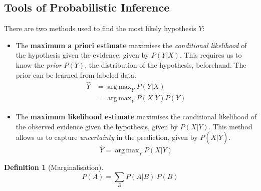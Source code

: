 \documentclass[12pt,a4paper,twoside,openright]{report} \usepackage[pdfborder={0 0 0}]{hyperref}    %
\DeclareMathOperator*{\argmax}{arg\,max} \DeclareMathOperator*{\argmin}{arg\,min}
\theoremstyle{definition} \newtheorem{definition}{Definition}[section]
\begin{document}
    \subsection{Tools of Probabilistic Inference}


    There are two methods used to find the most likely hypothesis $Y$: \begin{itemize} \item  The \textbf{maximum
      a priori estimate} maximises the \textit{conditional likelihood} of the hypothesis given the evidence, given by
      $P(Y|X)$. This requires us to know the \textit{prior} $P(Y)$, the distribution of the hypothesis, beforehand. The
      prior can be learned from labeled data. \begin{equation} \begin{aligned} \hat{Y} &= \argmax_Y P(Y|X) \\ &=
      \argmax_Y P(X|Y)P(Y) \end{aligned} \label{eq:map} \end{equation} \item  The \textbf{maximum likelihood estimate}
      maximises the conditional likelihood of the observed evidence given the hypothesis, given by $P(X|Y)$. This method
      allows us to capture \textit{uncertainty} in the prediction, given by $P(X|\hat{Y})$. \begin{equation} \hat{Y}
    = \argmax_Y P(X|Y) \label{eq:mle} \end{equation} \end{itemize}
%
%
    \begin{definition}[Marginalisation] \begin{equation} P(A) = \sum\limits_B P(A|B)~P(B) \label{eq:marginalisation}
    \end{equation} \end{definition}
\end{document}
